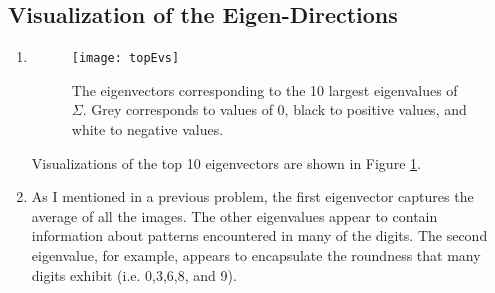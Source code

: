\documentclass{article}
\begin{document}
\subsection{Visualization of the Eigen-Directions}
\begin{enumerate}
	\item
	\begin{figure}
        \centering
        \texttt{[image: topEvs]}
        \caption{The eigenvectors corresponding to the 10 largest eigenvalues of $\Sigma$. Grey corresponds to values of 0, black to positive values, and white to negative values.} 
        \label{fig:topEvs}
    \end{figure}
	Visualizations of the top 10 eigenvectors are shown in Figure \ref{fig:topEvs}.
	\item As I mentioned in a previous problem, the first eigenvector captures the average of all the images. The other eigenvalues appear to contain information about patterns encountered in many of the digits. The second eigenvalue, for example, appears to encapsulate the roundness that many digits exhibit (i.e. 0,3,6,8, and 9). 
\end{enumerate}
\end{document}
